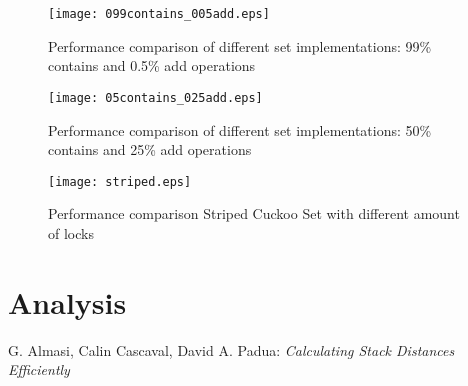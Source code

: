\documentclass[a4paper,10pt]{article}
\begin{document}
\begin{figure}
\begin{center}
\texttt{[image: 099contains\_005add.eps]}
\end{center}
\caption{Performance comparison of different set implementations: 99\% contains and 0.5\% add operations}
\label{fig:plot1}
\end{figure}

\begin{figure}
\begin{center}
\texttt{[image: 05contains\_025add.eps]}
\end{center}
\caption{Performance comparison of different set implementations: 50\% contains and 25\% add operations}
\label{fig:plot2}
\end{figure}

\begin{figure}
\begin{center}
\texttt{[image: striped.eps]}
\end{center}
\caption{Performance comparison Striped Cuckoo Set with different amount of locks}
\label{fig:plot3}
\end{figure}

\section{Analysis}
\label{sec:analysis}


\begin{thebibliography}{9}
   G. Almasi, Calin Cascaval, David A. Padua: 
   \emph{Calculating Stack Distances Efficiently}
\end{thebibliography}
\end{document}

